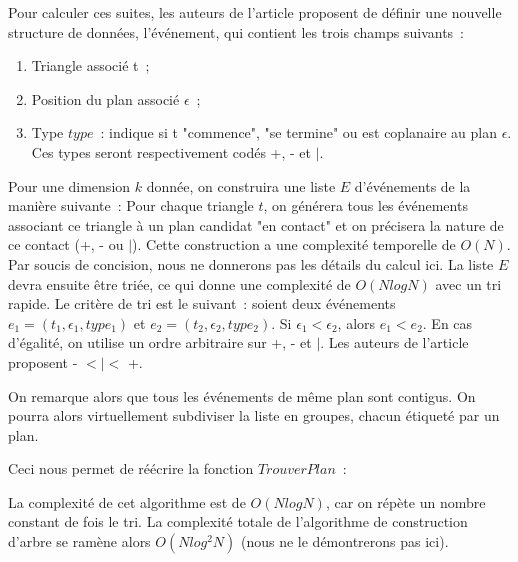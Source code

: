 \documentclass[a4paper]{article}
\begin{document}
Pour calculer ces suites, les auteurs de l'article proposent de définir une nouvelle structure de données, l'événement, qui contient les trois champs suivants~:
\begin{enumerate}
	\item Triangle associé t~;
	\item Position du plan associé $\epsilon$~;
	\item Type $type$~: indique si t "commence", "se termine" ou est coplanaire au plan $\epsilon$. Ces types seront respectivement codés +, - et $|$.
\end{enumerate}

Pour une dimension $k$ donnée, on construira une liste $E$ d'événements de la manière suivante~: Pour chaque triangle $t$, on générera tous les événements associant ce triangle à un plan candidat "en contact" et on précisera la nature de ce contact (+, - ou $|$). Cette construction a une complexité temporelle de $O(N)$. Par soucis de concision, nous ne donnerons pas les détails du calcul ici. La liste $E$ devra ensuite être triée, ce qui donne une complexité de $O(NlogN)$ avec un tri rapide. Le critère de tri est le suivant~: soient deux événements $e_1 = (t_1, \epsilon_1, type_1)$ et $e_2 = (t_2, \epsilon_2, type_2)$. Si $\epsilon_1 < \epsilon_2$, alors $e_1 < e_2$. En cas d'égalité, on utilise un ordre arbitraire sur +, - et $|$. Les auteurs de l'article proposent - $< | <$ +.

On remarque alors que tous les événements de même plan sont contigus. On pourra alors virtuellement subdiviser la liste en groupes, chacun étiqueté par un plan.

Ceci nous permet de réécrire la fonction $TrouverPlan$~:
\begin{algorithm}
\end{algorithm}

La complexité de cet algorithme est de $O(NlogN)$, car on répète un nombre constant de fois le tri. La complexité totale de l'algorithme de construction d'arbre se ramène alors $O(Nlog^2N)$ (nous ne le démontrerons pas ici).
\end{document}
